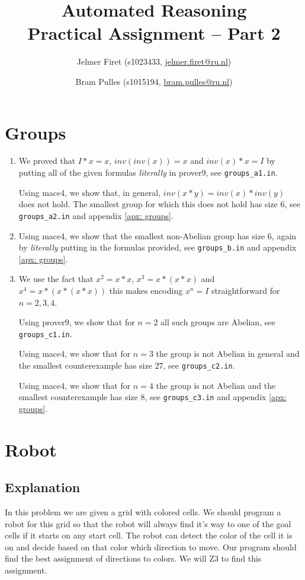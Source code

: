 \documentclass{scrartcl}
\author{Jelmer Firet (s1023433, \href{mailto:jelmer.firet@ru.nl}{jelmer.firet@ru.nl}) \and
Bram Pulles (s1015194, \href{mailto:bram.pulles@ru.nl}{bram.pulles@ru.nl})}
\title{\textbf{Automated Reasoning\\Practical Assignment -- Part 2}}
\begin{document}
\maketitle

\section{Groups} %
\label{sec:groups}
\begin{enumerate}[label=\alph*)]
\item
	We proved that $I*x=x$, $inv(inv(x))=x$ and $inv(x)*x=I$ by putting all of
	the given formulas \textit{literally} in prover9, see
	\texttt{groups\_a1.in}.

	Using mace4, we show that, in general, $inv(x*y)=inv(x)*inv(y)$ does not
	hold. The smallest group for which this does not hold has size $6$, see
	\texttt{groups\_a2.in} and appendix \ref{apx: groups}.
\item
	Using mace4, we show that the smallest non-Abelian group has size $6$,
	again by \textit{literally} putting in the formulas provided, see
	\texttt{groups\_b.in} and appendix \ref{apx: groups}.
\item
	We use the fact that $x^2 = x * x$, $x^3 = x * (x * x)$ and $x^4 = x * (x *
	(x * x))$ this makes encoding $x^n = I$ straightforward for $n = 2, 3, 4$.

	Using prover9, we show that for $n=2$ all such groups are Abelian, see \texttt{groups\_c1.in}.

	Using mace4, we show that for $n=3$ the group is not Abelian in general and
	the smallest counterexample has size $27$, see \texttt{groups\_c2.in}.

	Using mace4, we show that for $n=4$ the group is not Abelian and the
	smallest counterexample has size $8$, see \texttt{groups\_c3.in} and
	appendix \ref{apx: groups}.
\end{enumerate}

\pagebreak
\section{Robot} %
\label{sec:robot}

	\subsection{Explanation} %
	\label{sub:explanation}
	In this problem we are given a grid with colored cells. We should program a robot for this grid so that the robot will always find it's way to one of the goal cells if it starts on any start cell.
	The robot can detect the color of the cell it is on and decide based on that color which direction to move. Our program should find the best assignment of directions to colors. We will Z3 to find this assignment.
\end{document}
